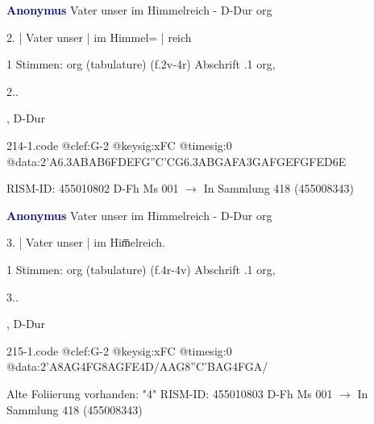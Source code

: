 \documentclass[twocolumn]{book}
\begin{document}
\newline \par \vspace{7pt} \textcolor{darkblue}{\textbf{Anonymus  }}
\newline Vater unser im Himmelreich - D-Dur
\newline org
\newline \begin{itshape}[f.2v, at left:] 2. | Vater unser | im Himmel= | reich\end{itshape} 
\newline \textcolor{darkblue}{}  1 Stimmen: org (tabulature)  (f.2v-4r)
\newline Abschrift
.1  org, \begin{itshape}2..\end{itshape}, D-Dur  
\begin{filecontents*}{214-1.code}
@clef:G-2
@keysig:xFC
@timesig:0
@data:2'A{6.3ABAB}{6FDEF}{G''C'CG}{6.3ABGA}{FA}{3GAFG}{EFGF}{ED6E}
\end{filecontents*}
\newline
%
\newline RISM-ID: 455010802
\newline D-Fh  Ms 001
\newline $\rightarrow$ In Sammlung 418 (455008343)
      
\newline \par \vspace{7pt} \textcolor{darkblue}{\textbf{Anonymus  }}
\newline Vater unser im Himmelreich - D-Dur
\newline org
\newline \begin{itshape}[f.4r, at left:] 3. | Vater unser | im Him̅elreich.\end{itshape} 
\newline \textcolor{darkblue}{}  1 Stimmen: org (tabulature)  (f.4r-4v)
\newline Abschrift
.1  org, \begin{itshape}3..\end{itshape}, D-Dur  
\begin{filecontents*}{215-1.code}
@clef:G-2
@keysig:xFC
@timesig:0
@data:2'A{8AG}4FG{8AG}{FE}4D/AAG{8''C'BAG}4FGA/
\end{filecontents*}
\newline
%
\newline Alte Foliierung vorhanden: "4"
\newline RISM-ID: 455010803
\newline D-Fh  Ms 001
\newline $\rightarrow$ In Sammlung 418 (455008343)
      
\end{document}
